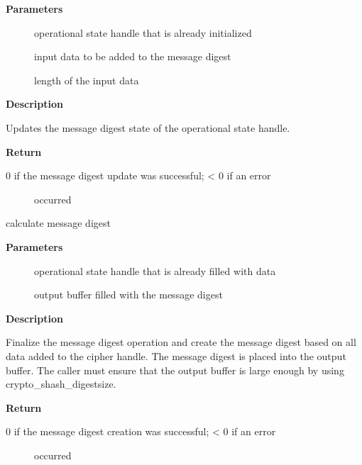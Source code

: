 \documentclass[a4paper,8pt,english]{sphinxmanual}
\begin{document}
\textbf{Parameters}
\begin{description}
\item[{}] \leavevmode
operational state handle that is already initialized

\item[{}] \leavevmode
input data to be added to the message digest

\item[{}] \leavevmode
length of the input data

\end{description}

\textbf{Description}

Updates the message digest state of the operational state handle.

\textbf{Return}
\begin{description}
\item[{0 if the message digest update was successful; \textless{} 0 if an error}] \leavevmode
occurred

\end{description}

\begin{fulllineitems}
\label{crypto/api-digest:c.crypto_shash_final}
calculate message digest

\end{fulllineitems}


\textbf{Parameters}
\begin{description}
\item[{}] \leavevmode
operational state handle that is already filled with data

\item[{}] \leavevmode
output buffer filled with the message digest

\end{description}

\textbf{Description}

Finalize the message digest operation and create the message digest
based on all data added to the cipher handle. The message digest is placed
into the output buffer. The caller must ensure that the output buffer is
large enough by using crypto\_shash\_digestsize.

\textbf{Return}
\begin{description}
\item[{0 if the message digest creation was successful; \textless{} 0 if an error}] \leavevmode
occurred

\end{description}
\end{document}
